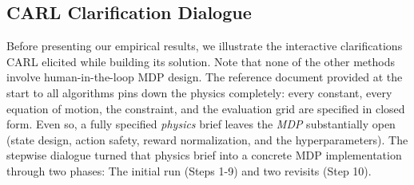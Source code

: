 \documentclass[mnsc,sglanonrev]{informs4}
\begin{document}
\subsection{CARL Clarification Dialogue}
\label{sec:god-carl-clarifications}

Before presenting our empirical results, we illustrate the interactive clarifications CARL elicited while building its solution. Note that none of the other methods involve human-in-the-loop MDP design. The reference document provided at the start to all algorithms pins down the physics completely: every constant, every equation of motion, the constraint, and the evaluation grid are specified in closed form. Even so, a fully specified \emph{physics} brief leaves the \emph{MDP} substantially open (state design, action safety, reward normalization, and the hyperparameters). The stepwise dialogue turned that physics brief into a concrete MDP implementation through two phases: The initial run (Steps 1-9) and two revisits (Step 10).
\end{document}
